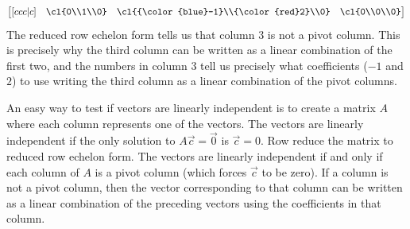 \begin{example}
$$\begin{bmatrix}[ccc|c]
&\cl{0\\1\\0}
&\cl{{\color{blue}-1}\\{\color{red}2}\\0}
&\cl{0\\0\\0}
\end{bmatrix}
$$
The reduced row echelon form tells us that column 3 is not a pivot column.  This is precisely why the third column can be written as a linear combination of the first two, and the numbers in column 3 tell us precisely what coefficients ($-1$ and $2$) to use writing the third column as a linear combination of the pivot columns. 
\end{example}

An easy way to test if vectors are linearly independent is to create a matrix $A$ where each column represents one of the vectors. 
The vectors are linearly independent if the only solution to $A\vec c=\vec 0$ is $\vec c=0$. Row reduce the matrix to reduced row echelon form. 
The vectors are linearly independent if and only if each column of $A$ is a pivot column (which forces $\vec c$ to be zero). 
If a column is not a pivot column, then the vector corresponding to that column can be written as a linear combination of the preceding vectors using the coefficients in that column. 

